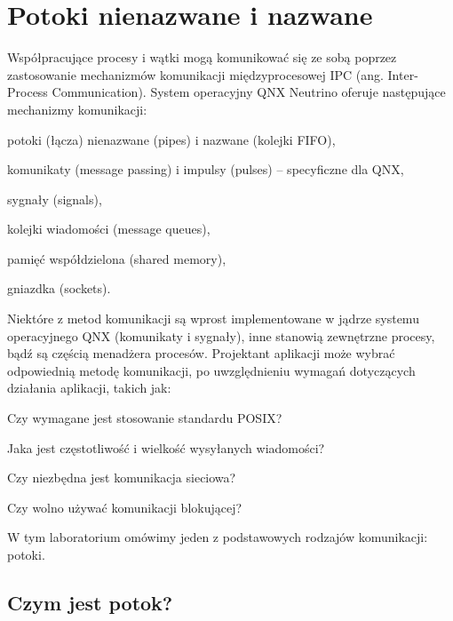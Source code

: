 \section{Potoki nienazwane i nazwane}
\label{sec:TQIXQ}

Współpracujące procesy i wątki mogą komunikować się ze sobą poprzez
zastosowanie mechanizmów komunikacji międzyprocesowej IPC (ang. Inter-Process
Communication). System operacyjny QNX Neutrino oferuje następujące mechanizmy
komunikacji: 
\begin{myitemize}
  \item potoki (łącza) nienazwane (pipes) i nazwane (kolejki FIFO),
  \item komunikaty (message passing) i impulsy (pulses) – specyficzne dla QNX,
  \item sygnały (signals),
  \item kolejki wiadomości (message queues),
  \item pamięć współdzielona (shared memory),
  \item gniazdka (sockets).
\end{myitemize}

Niektóre z metod komunikacji są wprost implementowane w jądrze systemu
operacyjnego QNX (komunikaty i sygnały), inne stanowią zewnętrzne procesy, bądź
są częścią menadżera procesów. Projektant aplikacji może wybrać odpowiednią
metodę komunikacji, po uwzględnieniu wymagań dotyczących działania aplikacji,
takich jak:
\begin{myitemize}
  \item Czy wymagane jest stosowanie standardu POSIX?
  \item Jaka jest częstotliwość i wielkość wysyłanych wiadomości?
  \item Czy niezbędna jest komunikacja sieciowa?
  \item Czy wolno używać komunikacji blokującej?
\end{myitemize}

W tym laboratorium omówimy jeden z podstawowych rodzajów komunikacji: potoki.

\subsection{Czym jest potok?}
\label{sec:JT0OO}

